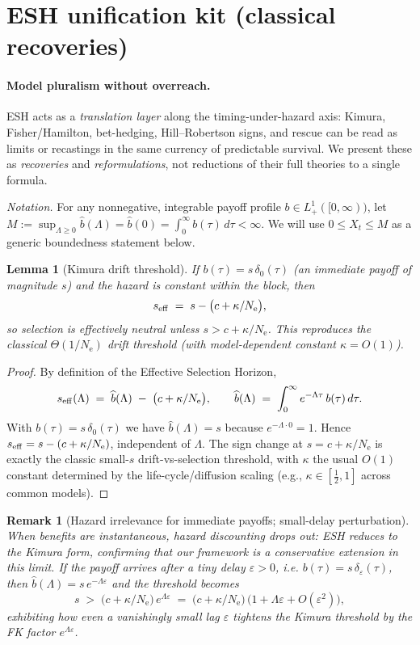 \documentclass[11pt]{article}
\theoremstyle{upright}
\newtheorem{lemma}{Lemma}
\newtheorem{remark}{Remark}
\newcommand{\Ne}{N_{\mathrm{e}}}
\newcommand{\seff}[1][]{s_{\mathrm{eff}\if\relax\detokenize{#1}\relax\else,#1\fi}}
\begin{document}
\section{ESH unification kit (classical recoveries)}
\label{sec:unification}

\paragraph{Model pluralism without overreach.}
ESH acts as a \emph{translation layer} along the timing-under-hazard axis: Kimura, Fisher/Hamilton, bet-hedging, Hill–Robertson signs, and rescue can be read as limits or recastings in the same currency of predictable survival. We present these as \emph{recoveries} and \emph{reformulations}, not reductions of their full theories to a single formula.

\noindent\textit{Notation.} For any nonnegative, integrable payoff profile $b\in L^1_+([0,\infty))$,
let $M:=\sup_{\Lambda\ge 0}\widehat b(\Lambda)=\widehat b(0)=\int_0^\infty b(\tau)\,d\tau<\infty$.
We will use $0\le X_t\le M$ as a generic boundedness statement below.

\begin{lemma}[Kimura drift threshold]\label{lem:kimura}
If $b(\tau)=s\,\delta_0(\tau)$ (an immediate payoff of magnitude $s$) and the hazard is constant within the block, then
\[
\seff \;=\; s - \big(c+\kappa/\Ne\big),
\]
so selection is effectively neutral unless $s > c+\kappa/\Ne$. This reproduces the classical $\Theta(1/\Ne)$ drift threshold (with model-dependent constant $\kappa=O(1)$).
\end{lemma}

\begin{proof}
By definition of the Effective Selection Horizon,
\[
\seff(\Lambda)\;=\;\widehat b(\Lambda)\;-\;\big(c+\kappa/\Ne\big),
\qquad
\widehat b(\Lambda)\;=\;\int_0^\infty e^{-\Lambda\tau}\,b(\tau)\,d\tau.
\]
With $b(\tau)=s\,\delta_0(\tau)$ we have $\widehat b(\Lambda)=s$ because $e^{-\Lambda\cdot 0}=1$. Hence $\seff=s-(c+\kappa/\Ne)$, independent of $\Lambda$. The sign change at $s=c+\kappa/\Ne$ is exactly the classic small-$s$ drift-vs-selection threshold, with $\kappa$ the usual $O(1)$ constant determined by the life-cycle/diffusion scaling (e.g., $\kappa\in[\tfrac12,1]$ across common models).
\end{proof}

\begin{remark}[Hazard irrelevance for immediate payoffs; small-delay perturbation]
When benefits are instantaneous, hazard discounting drops out: ESH reduces to the Kimura form, confirming that our framework is a conservative extension in this limit. If the payoff arrives after a tiny delay $\varepsilon>0$, i.e. $b(\tau)=s\,\delta_\varepsilon(\tau)$, then $\widehat b(\Lambda)=s\,e^{-\Lambda\varepsilon}$ and the threshold becomes
\[
s \;>\; \big(c+\kappa/\Ne\big)\,e^{\Lambda\varepsilon}
\;=\; \big(c+\kappa/\Ne\big)\,\big(1+\Lambda\varepsilon+O(\varepsilon^2)\big),
\]
exhibiting how even a vanishingly small lag $\varepsilon$ tightens the Kimura threshold by the FK factor $e^{\Lambda\varepsilon}$.
\end{remark}
\end{document}

